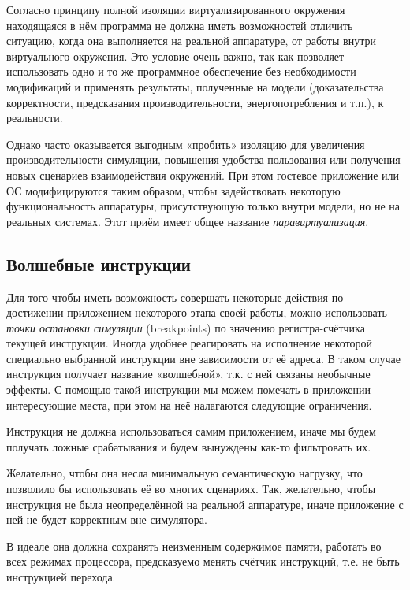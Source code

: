Согласно принципу полной изоляции виртуализированного окружения находящаяся в нём программа не должна иметь возможностей отличить ситуацию, когда она выполняется на реальной аппаратуре, от работы внутри виртуального окружения. Это условие очень важно, так как позволяет использовать одно и то же программное обеспечение без необходимости модификаций и применять результаты, полученные на модели (доказательства корректности, предсказания производительности, энергопотребления и т.п.), к реальности.

Однако часто оказывается выгодным «пробить» изоляцию для увеличения производительности симуляции, повышения удобства пользования или получения новых сценариев взаимодействия окружений. При этом гостевое приложение или ОС модифицируются таким образом, чтобы задействовать некоторую функциональность аппаратуры, присутствующую только внутри модели, но не на реальных системах. Этот приём имеет общее название \textit{паравиртуализация}.

\subsection{Волшебные инструкции}

Для того чтобы иметь возможность совершать некоторые действия по достижении приложением некоторого этапа своей работы, можно использовать \textit{точки остановки симуляции} (\abbr breakpoints) по значению регистра-счётчика текущей инструкции. Иногда удобнее реагировать на исполнение некоторой специально выбранной инструкции вне зависимости от её адреса. В таком случае инструкция получает название «волшебной», т.к. с ней связаны необычные эффекты. С помощью такой инструкции мы можем помечать в приложении интересующие места, при этом на неё налагаются следующие ограничения.

\begin{itemize*}
\item    Инструкция не должна использоваться самим приложением, иначе мы будем получать ложные срабатывания и будем вынуждены как-то фильтровать их.
\item    Желательно, чтобы она несла минимальную семантическую нагрузку, что позволило бы использовать её во многих сценариях. Так, желательно, чтобы инструкция не была неопределённой на реальной аппаратуре, иначе приложение с ней не будет корректным вне симулятора. 
\item В идеале она должна сохранять неизменным содержимое памяти, работать во всех режимах процессора, предсказуемо менять счётчик инструкций, т.е. не быть инструкцией перехода. 
\end{itemize*}

